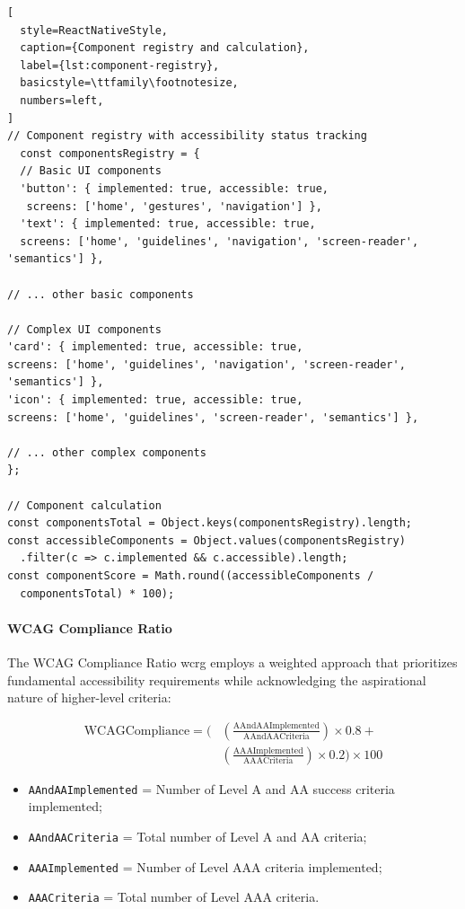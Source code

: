 \begin{lstlisting}[
  style=ReactNativeStyle,
  caption={Component registry and calculation},
  label={lst:component-registry},
  basicstyle=\ttfamily\footnotesize,
  numbers=left,
]
// Component registry with accessibility status tracking
  const componentsRegistry = {
  // Basic UI components
  'button': { implemented: true, accessible: true,
   screens: ['home', 'gestures', 'navigation'] },
  'text': { implemented: true, accessible: true,
  screens: ['home', 'guidelines', 'navigation', 'screen-reader', 'semantics'] },
  
// ... other basic components

// Complex UI components
'card': { implemented: true, accessible: true,
screens: ['home', 'guidelines', 'navigation', 'screen-reader', 'semantics'] },
'icon': { implemented: true, accessible: true,
screens: ['home', 'guidelines', 'screen-reader', 'semantics'] },

// ... other complex components
};

// Component calculation
const componentsTotal = Object.keys(componentsRegistry).length;
const accessibleComponents = Object.values(componentsRegistry)
  .filter(c => c.implemented && c.accessible).length;
const componentScore = Math.round((accessibleComponents / 
  componentsTotal) * 100);
\end{lstlisting}

\FloatBarrier

\paragraph{WCAG Compliance Ratio}

The WCAG Compliance Ratio {\gls{wcrg}} employs a weighted approach that prioritizes fundamental accessibility requirements while acknowledging the aspirational nature of higher-level criteria:

\begin{align}
\text{WCAGCompliance} = \Bigg(&\left(\frac{\text{AAndAAImplemented}}{\text{AAndAACriteria}}\right) \times 0.8 + \\
&\left(\frac{\text{AAAImplemented}}{\text{AAACriteria}}\right) \times 0.2\Bigg) \times 100
\end{align}

\begin{itemize}
\item \texttt{AAndAAImplemented} = Number of Level A and AA success criteria implemented;
\item \texttt{AAndAACriteria} = Total number of Level A and AA criteria;
\item \texttt{AAAImplemented} = Number of Level AAA criteria implemented;
\item \texttt{AAACriteria} = Total number of Level AAA criteria.
\end{itemize}

